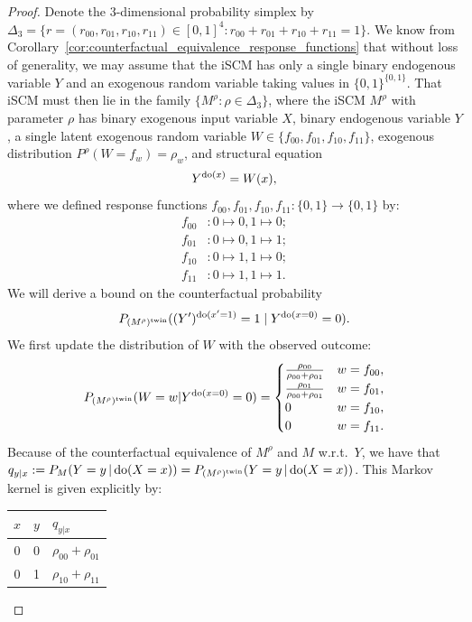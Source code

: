 \begin{proof}
  Denote the $3$-dimensional probability simplex by $\Delta_3=\{r=(r_{00},r_{01},r_{10},r_{11}) \in [0,1]^4 : r_{00}+r_{01}+r_{10}+r_{11}= 1\}$.
  We know from Corollary~\ref{cor:counterfactual_equivalence_response_functions} that without loss of generality, we may assume that the iSCM has only a single binary endogenous variable $Y$ and an exogenous random variable taking values in $\{0,1\}^{\{0,1\}}$.
  That iSCM must then lie in the family $\{M^\rho : \rho \in \Delta_3\}$, where the iSCM $M^\rho$ with parameter $\rho$ has binary exogenous input variable $X$, binary endogenous variable $Y$, a single latent exogenous random variable $W \in \{f_{00},f_{01},f_{10},f_{11}\}$, exogenous distribution $P^\rho(W=f_w) = \rho_w$, and structural equation
  $$Y^{\operatorname{do}(x)} = W(x),$$
where we defined response functions $f_{00},f_{01},f_{10},f_{11} : \{0,1\} \to \{0,1\}$ by:
  \begin{align*}
    f_{00} &: 0 \mapsto 0, 1 \mapsto 0;\\
    f_{01} &: 0 \mapsto 0, 1 \mapsto 1;\\
    f_{10} &: 0 \mapsto 1, 1 \mapsto 0;\\
    f_{11} &: 0 \mapsto 1, 1 \mapsto 1.
  \end{align*}
We will derive a bound on the counterfactual probability
  $$P_{(M^{\rho})^{\mathrm{twin}}}((Y')^{\operatorname{do}(x'=1)}=1\mid Y^{\operatorname{do}(x=0)}=0).$$
We first update the distribution of $W$ with the observed outcome:
  $$P_{(M^{\rho})^{\mathrm{twin}}}(W=w | Y^{\operatorname{do}(x=0)}=0) = 
    \begin{cases}
      \frac{\rho_{00}}{\rho_{00} + \rho_{01}} & w = f_{00}, \\
      \frac{\rho_{01}}{\rho_{00} + \rho_{01}} & w = f_{01}, \\
      0 & w = f_{10}, \\
      0 & w = f_{11}.
    \end{cases}$$
Because of the counterfactual equivalence of $M^\rho$ and $M$ w.r.t.\ $Y$, we have that
  $q_{y|x} := P_M(Y=y\operatorname*{|} \operatorname{do}(X=x)) = P_{(M^{\rho})^{\mathrm{twin}}}(Y=y\operatorname*{|} \operatorname{do}(X=x))$.
This Markov kernel is given explicitly by:
  \begin{center}\begin{tabular}{ccl}
    $x$ & $y$ & $q_{y|x}$ \\
    \hline
    0   & 0   & $\rho_{00} + \rho_{01}$ \\ %
    0   & 1   & $\rho_{10} + \rho_{11}$ \\ %

\end{tabular}
\end{center}
\end{proof}
